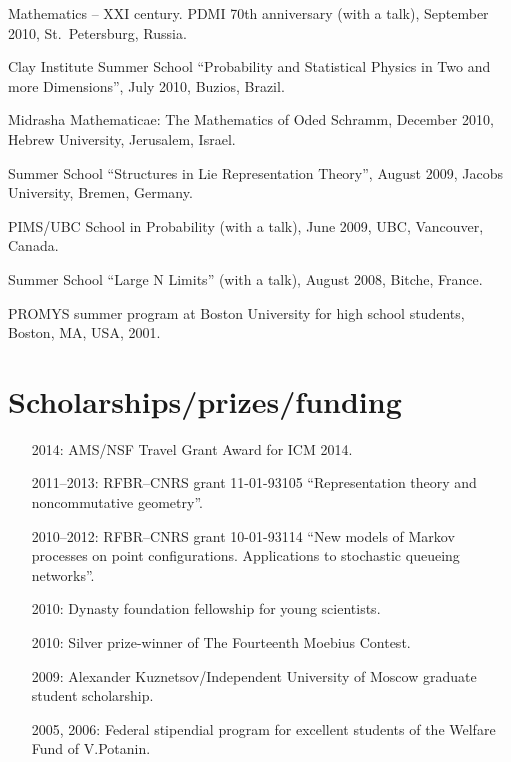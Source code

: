 \documentclass[letterpaper,11pt]{article}
\begin{document}
\begin{etaremune}
\item Mathematics -- XXI century. PDMI 70th anniversary (with a talk), September 2010, St.~Petersburg, Russia.

\item Clay Institute Summer School ``Probability and Statistical Physics in Two and more Dimensions'', July 2010, Buzios, Brazil. 

\item Midrasha Mathematicae: The Mathematics of Oded Schramm, December 2010, Hebrew University, Jerusalem, Israel. 

\item Summer School ``Structures in Lie Representation Theory'', August 2009, Jacobs University, Bremen, Germany. 

\item PIMS/UBC School in Probability (with a talk), June 2009, UBC, Vancouver, Canada. 

\item 
Summer School ``Large N Limits'' (with a talk), August 2008, Bitche, France. 

\item PROMYS summer program at Boston University for high school students, Boston, MA, USA, 2001.
\end{etaremune}

\section*{Scholarships/prizes/funding}
\begin{itemize}
  \item[2014:] AMS/NSF Travel Grant Award for ICM 2014.

  \item[2011--2013:] RFBR--CNRS grant 11-01-93105 ``Representation theory and noncommutative geometry''.
  
  \item[2010--2012:] RFBR--CNRS grant 10-01-93114 ``New models of Markov processes on point configurations. Applications to stochastic queueing networks''.

  \item[2010:] Dynasty foundation fellowship for young scientists.
    
  \item[2010:] Silver prize-winner of The Fourteenth Moebius Contest.

  \item[2009:] Alexander Kuznetsov/Independent University of Moscow graduate student scholarship.

  \item[2005, 2006:] Federal stipendial program for excellent students of the Welfare Fund of V.Potanin.
\end{itemize}
\end{document}
